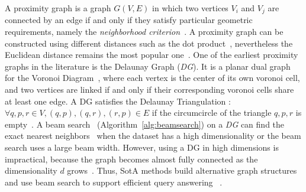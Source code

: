 A proximity graph is a graph $G\left({V},{E}\right)$ in which two vertices $V_i$ and $V_j$ are connected by an edge if and only if they satisfy particular geometric requirements, namely the \textit{neighborhood criterion}~\cite{shamos1975closest}.
A proximity graph can be constructed using different distances such as the dot product~\cite{mipsg}, nevertheless the Euclidean distance remains the most popular one~\cite{edelsbrunner87}. One of the earliest proximity graphs in the literature is the Delaunay Graph (\textit{DG}). It is a planar dual graph for the Voronoi Diagram~\cite{vd95}, where each vertex is the center of its own voronoi cell, and two vertices are linked if and only if their corresponding voronoi cells share at least one edge. A DG 
satisfies the Delaunay Triangulation :$\forall q,p,r \in {V}, \left(q,p\right), \left(q,r\right), \left(r,p\right) \in {E}$
if the circumcircle of the triangle $q, p, r$ is empty~\cite{aurenhammer2013voronoi}.
A beam search~\cite{reddy77bm} (Algorithm~\ref{alg:beamsearch}) on a \textit{DG} can find the exact nearest neighbors~\cite{dobkin1990delaunay} when the dataset has a high dimensionality or the beam search uses a large beam width.
However, using a DG in high dimensions is impractical, because the graph becomes almost fully connected as the dimensionality $d$ grows~\cite{dobkin1990delaunay}. 
Thus, SotA methods build alternative graph structures and use beam search to support efficient query answering
~\cite{gabriel69,matula80,toussaint02}. 


